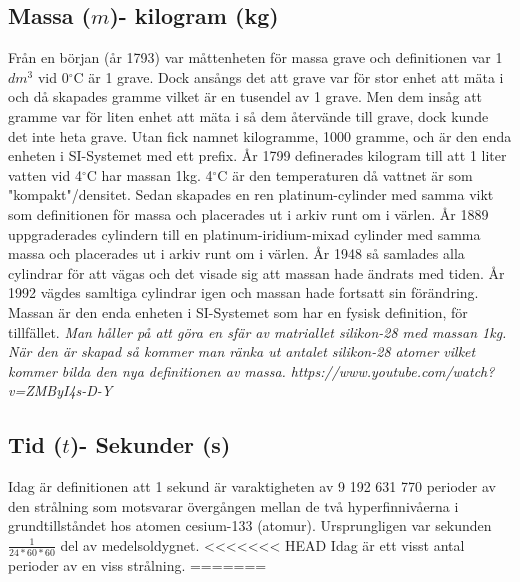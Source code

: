 \documentclass[a4paper,11pt]{article}
\begin{document}
\begin{flushleft}
\subsection{Massa ($m$)- kilogram (kg)}
Från en början (år 1793) var måttenheten för massa grave och definitionen var 1$dm^3$ vid 0$^{\circ}$C är 1 grave.
Dock ansångs det att grave var för stor enhet att mäta i och då skapades gramme vilket är en tusendel av 1 grave.
Men dem insåg att gramme var för liten enhet att mäta i så dem återvände till grave, dock kunde det inte heta grave. 
Utan fick namnet kilogramme, 1000 gramme, och är den enda enheten i SI-Systemet med ett prefix.\newline\newline
År 1799 definerades kilogram till att 1 liter vatten vid 4$^{\circ}$C har massan 1kg. 4$^{\circ}$C är den temperaturen
då vattnet är som "kompakt"/densitet.\newline
Sedan skapades en ren platinum-cylinder med samma vikt som definitionen för massa och placerades ut i arkiv runt om i värlen.\newline\newline
År 1889 uppgraderades cylindern till en platinum-iridium-mixad cylinder med samma massa och placerades ut i arkiv runt om i värlen.\newline\newline
År 1948 så samlades alla cylindrar för att vägas och det visade sig att massan hade ändrats med tiden.\newline\newline
År 1992 vägdes samltiga cylindrar igen och massan hade fortsatt sin förändring.\newline\newline
Massan är den enda enheten i SI-Systemet som har en fysisk definition, för tillfället.\newline
\textit{Man håller på att göra en sfär av matriallet silikon-28 med massan 1kg. När den är skapad så kommer man
ränka ut antalet silikon-28 atomer vilket kommer bilda den nya definitionen av massa. https://www.youtube.com/watch?v=ZMByI4s-D-Y}
\newline
\newline
\subsection{Tid ($t$)- Sekunder (s)}
Idag är definitionen att 1 sekund är varaktigheten av 9 192 631 770 perioder av den strålning som motsvarar övergången mellan de två 
hyperfinnivåerna i grundtillståndet hos atomen cesium-133 (atomur). \newline \newline
Ursprungligen var sekunden $ \frac{1}{24*60*60} $ del av medelsoldygnet.
\newline
<<<<<<< HEAD
Idag är ett visst antal perioder av en viss strålning.
=======

\end{flushleft}
\end{document}
